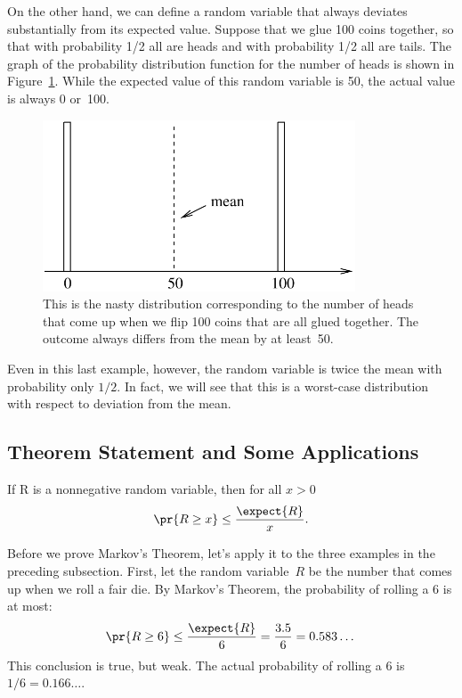 On the other hand, we can define a random variable that always
deviates substantially from its expected value.  Suppose that we glue
100 coins together, so that with probability 1/2 all are heads and
with probability 1/2 all are tails.  The graph of the probability
distribution function for the number of heads is shown in
Figure~\ref{fig:nasty}.  While the expected value of this random
variable is 50, the actual value is always 0 or~100.
\begin{figure}
  \centerline{\includegraphics[height=2in]{figures/nasty}}
  \caption{This is the nasty distribution corresponding to the number
    of heads that come up when we flip 100 coins that are all glued
    together. The outcome always differs from the mean by at
    least~50.}
  \label{fig:nasty}
\end{figure}

Even in this last example, however, the random variable is twice the
mean with probability only $1/2$.  In fact, we will see that this is a
worst-case distribution with respect to deviation from the mean.


\subsection{Theorem Statement and Some Applications}
\fi

\begin{theorem}\label{markovthm}
  If R is a nonnegative random variable, then for all $x > 0$
  \begin{displaymath}
    \pr{R \geq x} \leq \frac{\expect{R}}{x}.
  \end{displaymath}
\end{theorem}

\iffalse

Before we prove Markov's Theorem, let's apply it to the three examples in
the preceding subsection.  First, let the random variable~$R$ be the
number that comes up when we roll a fair die.  By Markov's Theorem, the
probability of rolling a 6 is at most:
\[
\pr{R \geq 6} \leq \frac{\expect{R}}{6} = \frac{3.5}{6} = 0.583\dots
\]
This conclusion is true, but weak.  The actual probability of rolling
a 6 is $1/6 = 0.166\dots$.

